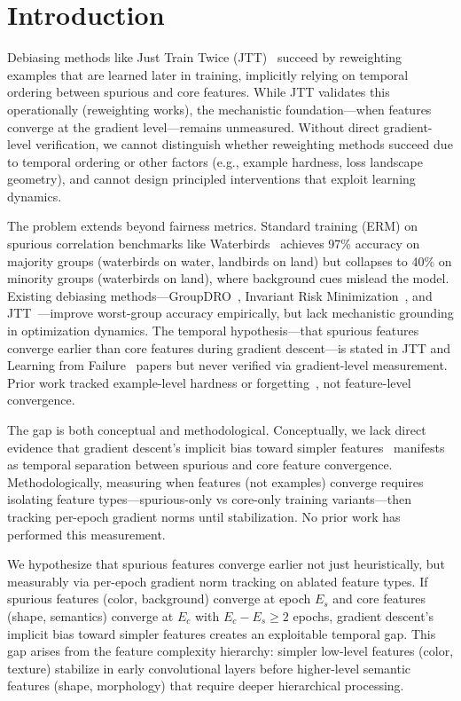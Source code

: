 \section{Introduction}

Debiasing methods like Just Train Twice (JTT)~\cite{nam2020learning} succeed by reweighting examples that are learned later in training, implicitly relying on temporal ordering between spurious and core features. While JTT validates this operationally (reweighting works), the mechanistic foundation---when features converge at the gradient level---remains unmeasured. Without direct gradient-level verification, we cannot distinguish whether reweighting methods succeed due to temporal ordering or other factors (e.g., example hardness, loss landscape geometry), and cannot design principled interventions that exploit learning dynamics.

The problem extends beyond fairness metrics. Standard training (ERM) on spurious correlation benchmarks like Waterbirds~\cite{sagawa2020distributionally} achieves 97\% accuracy on majority groups (waterbirds on water, landbirds on land) but collapses to 40\% on minority groups (waterbirds on land), where background cues mislead the model. Existing debiasing methods---GroupDRO~\cite{sagawa2020distributionally}, Invariant Risk Minimization~\cite{arjovsky2019invariant}, and JTT~\cite{nam2020learning}---improve worst-group accuracy empirically, but lack mechanistic grounding in optimization dynamics. The temporal hypothesis---that spurious features converge earlier than core features during gradient descent---is stated in JTT and Learning from Failure~\cite{liu2021just} papers but never verified via gradient-level measurement. Prior work tracked example-level hardness or forgetting~\cite{toneva2019empirical}, not feature-level convergence.

The gap is both conceptual and methodological. Conceptually, we lack direct evidence that gradient descent's implicit bias toward simpler features~\cite{soudry2018implicit} manifests as temporal separation between spurious and core feature convergence. Methodologically, measuring when features (not examples) converge requires isolating feature types---spurious-only vs core-only training variants---then tracking per-epoch gradient norms until stabilization. No prior work has performed this measurement.

We hypothesize that spurious features converge earlier not just heuristically, but measurably via per-epoch gradient norm tracking on ablated feature types. If spurious features (color, background) converge at epoch $E_s$ and core features (shape, semantics) converge at $E_c$ with $E_c - E_s \geq 2$ epochs, gradient descent's implicit bias toward simpler features creates an exploitable temporal gap. This gap arises from the feature complexity hierarchy: simpler low-level features (color, texture) stabilize in early convolutional layers before higher-level semantic features (shape, morphology) that require deeper hierarchical processing.

